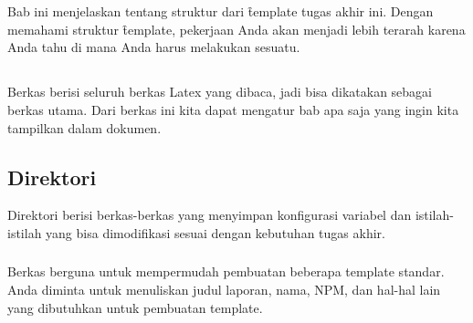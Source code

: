 \chapter{\babEmpat}
\label{bab:4}
Bab ini menjelaskan tentang struktur dari \f{template} tugas akhir ini.
Dengan memahami struktur \f{template}, pekerjaan Anda akan menjadi lebih terarah karena Anda tahu di mana Anda harus melakukan sesuatu.

\noindent{}


\section{}
\label{sec:thesis-tex}
Berkas  berisi seluruh berkas Latex yang dibaca, jadi bisa dikatakan sebagai berkas utama.
Dari berkas ini kita dapat mengatur bab apa saja yang ingin kita tampilkan dalam dokumen.


\section{Direktori }
\label{sec:config-dir}
Direktori  berisi berkas-berkas yang menyimpan konfigurasi variabel dan istilah-istilah yang bisa dimodifikasi sesuai dengan kebutuhan tugas akhir.

\subsection{}
\label{sec:settings-tex}
Berkas  berguna untuk mempermudah pembuatan beberapa template standar.
Anda diminta untuk menuliskan judul laporan, nama, NPM, dan hal-hal lain yang dibutuhkan untuk pembuatan template.

